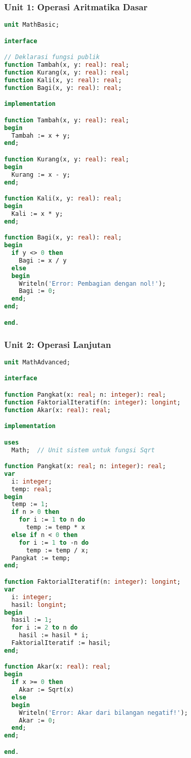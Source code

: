 \documentclass[../main.tex]{subfiles}
\begin{document}
\subsubsection{Unit 1: Operasi Aritmatika Dasar}
\begin{lstlisting}[language=Pascal, caption={mathbasic.pas - operasi aritmatika dasar}]
unit MathBasic;

interface

// Deklarasi fungsi publik
function Tambah(x, y: real): real;
function Kurang(x, y: real): real;
function Kali(x, y: real): real;
function Bagi(x, y: real): real;

implementation

function Tambah(x, y: real): real;
begin
  Tambah := x + y;
end;

function Kurang(x, y: real): real;
begin
  Kurang := x - y;
end;

function Kali(x, y: real): real;
begin
  Kali := x * y;
end;

function Bagi(x, y: real): real;
begin
  if y <> 0 then
    Bagi := x / y
  else
  begin
    Writeln('Error: Pembagian dengan nol!');
    Bagi := 0;
  end;
end;

end.
\end{lstlisting}

\subsubsection{Unit 2: Operasi Lanjutan}
\begin{lstlisting}[language=Pascal, caption={mathadvanced.pas - operasi matematika lanjutan}]
unit MathAdvanced;

interface

function Pangkat(x: real; n: integer): real;
function FaktorialIteratif(n: integer): longint;
function Akar(x: real): real;

implementation

uses
  Math;  // Unit sistem untuk fungsi Sqrt

function Pangkat(x: real; n: integer): real;
var
  i: integer;
  temp: real;
begin
  temp := 1;
  if n > 0 then
    for i := 1 to n do
      temp := temp * x
  else if n < 0 then
    for i := 1 to -n do
      temp := temp / x;
  Pangkat := temp;
end;

function FaktorialIteratif(n: integer): longint;
var
  i: integer;
  hasil: longint;
begin
  hasil := 1;
  for i := 2 to n do
    hasil := hasil * i;
  FaktorialIteratif := hasil;
end;

function Akar(x: real): real;
begin
  if x >= 0 then
    Akar := Sqrt(x)
  else
  begin
    Writeln('Error: Akar dari bilangan negatif!');
    Akar := 0;
  end;
end;

end.
\end{lstlisting}
\end{document}

